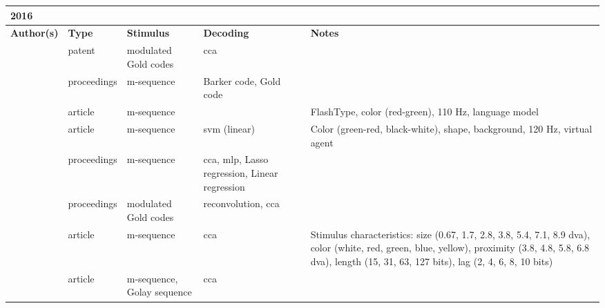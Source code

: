 \documentclass[a4paper,landscape]{article}
\begin{document}
\begin{table}[H]
	\begin{tabular}{p{5cm}p{2cm}p{5cm}p{5cm}p{6.5cm}}
		\textbf{2016} & & & & \\
		\toprule
		\textbf{Author(s)} & \textbf{Type} & \textbf{Stimulus} & \textbf{Decoding} & \textbf{Notes} \\
		\midrule
		\citeauthor{desain2016} & patent & modulated Gold codes & \acrshort{cca} & \\
		\citeauthor{isaksen2016} & proceedings & m-sequence & Barker code, Gold code & \\
		\citeauthor{nezamfar2016} & article & m-sequence & & FlashType, color (red-green), 110 Hz, language model \\
		\citeauthor{riechmann2016} & article & m-sequence &  \acrshort{svm} (linear) & Color (green-red, black-white), shape, background, 120 Hz, virtual agent \\
		\citeauthor{sato2016} & proceedings & m-sequence &\acrshort{cca}, \acrshort{mlp}, Lasso regression, Linear regression & \\
		\citeauthor{thielen2016} & proceedings & modulated Gold codes & reconvolution, \acrshort{cca} & \\
		\citeauthor{wei2016a} & article & m-sequence & \acrshort{cca} & Stimulus characteristics: size (0.67, 1.7, 2.8, 3.8, 5.4, 7.1, 8.9 dva), color (white, red, green, blue, yellow), proximity (3.8, 4.8, 5.8, 6.8 dva), length (15, 31, 63, 127 bits), lag (2, 4, 6, 8, 10 bits) \\
		\citeauthor{wei2016b} & article & m-sequence, Golay sequence & \acrshort{cca} & \\
		\bottomrule
	\end{tabular}
\end{table}
\end{document}
